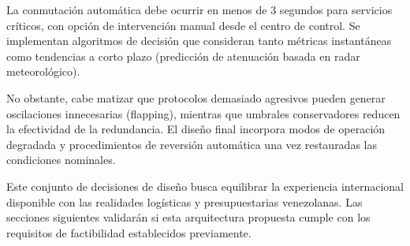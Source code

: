 La conmutación automática debe ocurrir en menos de 3 segundos para servicios críticos, con opción de intervención manual desde el centro de control. Se implementan algoritmos de decisión que consideran tanto métricas instantáneas como tendencias a corto plazo (predicción de atenuación basada en radar meteorológico).

No obstante, cabe matizar que protocolos demasiado agresivos pueden generar oscilaciones innecesarias (flapping), mientras que umbrales conservadores reducen la efectividad de la redundancia. El diseño final incorpora modos de operación degradada y procedimientos de reversión automática una vez restauradas las condiciones nominales.

Este conjunto de decisiones de diseño busca equilibrar la experiencia internacional disponible con las realidades logísticas y presupuestarias venezolanas. Las secciones siguientes validarán si esta arquitectura propuesta cumple con los requisitos de factibilidad establecidos previamente.